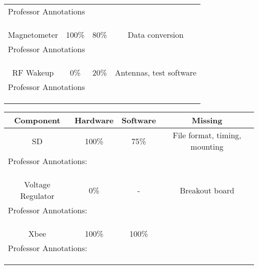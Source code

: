 \begin{center}
\begin{tabular}{|c|c|c|c|}
         \multicolumn{4}{|l|}{Professor Annotations} \\ 
         \multicolumn{4}{|l|}{} \\
         \multicolumn{4}{|l|}{} \\                   
         \multicolumn{4}{|l|}{} \\ \hline \hline      
        Magnetometer & 100\%   & 80\%  & Data conversion \\ \hline
         \multicolumn{4}{|l|}{Professor Annotations} \\ 
         \multicolumn{4}{|l|}{} \\
         \multicolumn{4}{|l|}{} \\                   
         \multicolumn{4}{|l|}{} \\ \hline \hline      
        RF Wakeup & 0\% & 20\%  & Antennas, test software \\ \hline
         \multicolumn{4}{|l|}{Professor Annotations} \\ 
         \multicolumn{4}{|l|}{} \\
         \multicolumn{4}{|l|}{} \\                   
         \multicolumn{4}{|l|}{} \\ \hline
        \end{tabular}%
       
    
      \begin{tabular}{|c|c|c|c|}
    \hline
    \rowcolor{Gray}
    Component & Hardware & Software & Missing \\
    \hline \hline       
        SD & 100\%  & 75\% & File format, timing, mounting \\ \hline
         \multicolumn{4}{|l|}{Professor Annotations:} \\ 
         \multicolumn{4}{|l|}{} \\
         \multicolumn{4}{|l|}{} \\                   
         \multicolumn{4}{|l|}{} \\ \hline \hline       
        Voltage Regulator & 0\% & - & Breakout board \\ \hline
       
         \multicolumn{4}{|l|}{Professor Annotations:} \\ 
         \multicolumn{4}{|l|}{} \\
         \multicolumn{4}{|l|}{} \\                   
         \multicolumn{4}{|l|}{} \\ \hline \hline
          Xbee  & 100\% & 100\%  & \\ \hline
            \multicolumn{4}{|l|}{Professor Annotations:} \\ 
         \multicolumn{4}{|l|}{} \\
         \multicolumn{4}{|l|}{} \\                   
         \multicolumn{4}{|l|}{} \\ \hline
        \end{tabular}%
        
        \end{center}